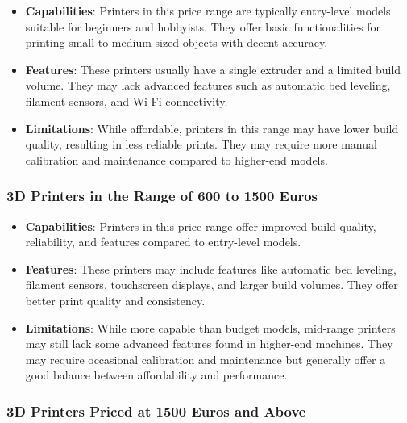 \begin{itemize}
    \item \textbf{Capabilities}: Printers in this price range are typically entry-level models 
    suitable for beginners and hobbyists. They offer basic functionalities for printing small to 
    medium-sized objects with decent accuracy.
    \item \textbf{Features}: These printers usually have a single extruder and a limited build 
    volume. They may lack advanced features such as automatic bed leveling, filament sensors, and 
    Wi-Fi connectivity.
    \item \textbf{Limitations}: While affordable, printers in this range may have lower build 
    quality, resulting in less reliable prints. They may require more manual calibration and 
    maintenance compared to higher-end models.
\end{itemize}

\subsubsection*{3D Printers in the Range of 600 to 1500 Euros}

\begin{itemize}
    \item \textbf{Capabilities}: Printers in this price range offer improved build quality, 
    reliability, and features compared to entry-level models.
    \item \textbf{Features}: These printers may include features like automatic bed leveling, 
    filament sensors, touchscreen displays, and larger build volumes. They offer better print 
    quality and consistency.
    \item \textbf{Limitations}: While more capable than budget models, mid-range printers may 
    still lack some advanced features found in higher-end machines. They may require occasional 
    calibration and maintenance but generally offer a good balance between affordability and 
    performance.
\end{itemize}

\subsubsection*{3D Printers Priced at 1500 Euros and Above}

